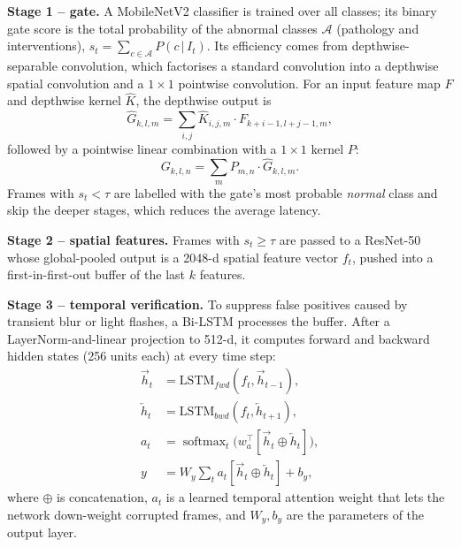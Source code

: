 \documentclass[conference]{IEEEtran}
\begin{document}
\textbf{Stage 1 -- gate.} A MobileNetV2 classifier is trained over all classes; its binary gate score is the total
probability of the abnormal classes $\mathcal{A}$ (pathology and interventions), $s_t=\sum_{c\in\mathcal{A}}
P(c\,|\,I_t)$. Its efficiency comes from depthwise-separable convolution, which factorises a standard convolution into
a depthwise spatial convolution and a $1\times1$ pointwise convolution. For an input feature map $F$ and depthwise
kernel $\hat{K}$, the depthwise output is
\begin{equation}
    \hat{G}_{k,l,m} = \sum_{i,j} \hat{K}_{i,j,m} \cdot F_{k+i-1, l+j-1, m},
\end{equation}
followed by a pointwise linear combination with a $1 \times 1$ kernel $P$:
\begin{equation}
    G_{k,l,n} = \sum_{m} P_{m,n} \cdot \hat{G}_{k,l,m}.
\end{equation}
Frames with $s_t<\tau$ are labelled with the gate's most probable \emph{normal} class and skip the deeper stages,
which reduces the average latency.

\textbf{Stage 2 -- spatial features.} Frames with $s_t\ge\tau$ are passed to a ResNet-50 whose global-pooled
output is a 2048-d spatial feature vector $f_t$, pushed into a first-in-first-out buffer of the last $k$ features.

\textbf{Stage 3 -- temporal verification.} To suppress false positives caused by transient blur or light flashes, a
Bi-LSTM \cite{hochreiter1997lstm, schuster1997bidirectional} processes the buffer. After a LayerNorm-and-linear
projection to 512-d, it computes forward and backward hidden states (256 units each) at every time step:
\begin{equation}
\begin{aligned}
    \overrightarrow{h}_t &= \text{LSTM}_{fwd}(f_t, \overrightarrow{h}_{t-1}),\\
    \overleftarrow{h}_t &= \text{LSTM}_{bwd}(f_t, \overleftarrow{h}_{t+1}),\\
    a_t &= \operatorname{softmax}_t\big(w_a^\top[\overrightarrow{h}_t \oplus \overleftarrow{h}_t]\big),\\
    y &= W_y \textstyle\sum_t a_t[\overrightarrow{h}_t \oplus \overleftarrow{h}_t] + b_y,
\end{aligned}
\end{equation}
where $\oplus$ is concatenation, $a_t$ is a learned temporal attention weight that lets the network down-weight
corrupted frames, and $W_y, b_y$ are the parameters of the output layer.
\end{document}
